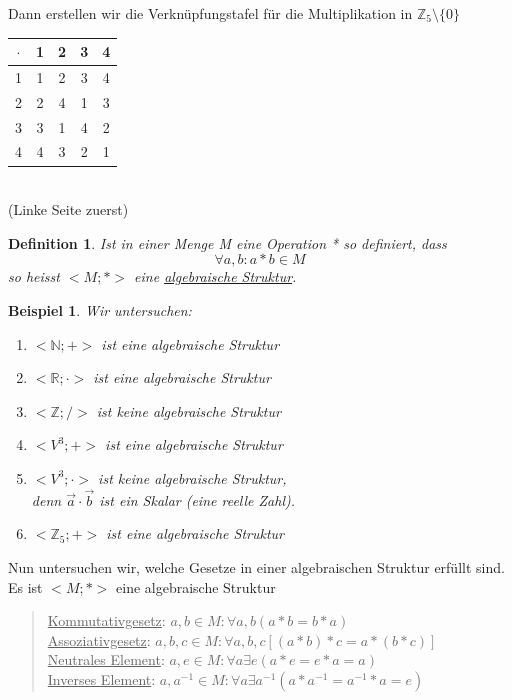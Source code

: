 \documentclass{report}
\newtheorem{mydef}{Definition}
\newtheorem{myexample}{Beispiel}
\begin{document}
Dann erstellen wir die Verknüpfungstafel für die Multiplikation in $\mathbb{Z}_5 \setminus \{0\}$
\begin{center}\begin{tabular}{c | c c c c}
$\cdot$ & 1 & 2 & 3 & 4 \\
\hline
1 & 1 & 2 & 3 & 4 \\
2 & 2 & 4 & 1 & 3 \\
3 & 3 & 1 & 4 & 2 \\
4 & 4 & 3 & 2 &1\end{tabular}\\(Linke Seite zuerst)\end{center}
\begin{mydef}Ist in einer Menge M eine Operation * so definiert, dass
\begin{equation}\forall a, b : a * b \in M\end{equation}
so heisst $< M; * >$ eine \underline{algebraische Struktur}.\end{mydef}
\begin{myexample}Wir untersuchen:
\begin{enumerate}\item $<\mathbb{N} ; + >$ ist eine algebraische Struktur
\item $<\mathbb{R} ; \cdot >$ ist eine algebraische Struktur
\item $<\mathbb{Z} ; / >$ ist keine algebraische Struktur
\item $< V^3 ; + >$ ist eine algebraische Struktur
\item $< V^3 ; \cdot >$ ist keine algebraische Struktur,\\
denn $\vec{a} \cdot \vec{b}$ ist ein Skalar (eine reelle Zahl).
\item $< \mathbb{Z}_5 ; + >$ ist eine algebraische Struktur\end{enumerate}\end{myexample}
Nun untersuchen wir, welche Gesetze in einer algebraischen Struktur erfüllt sind.
Es ist $< M ; * >$ eine algebraische Struktur
\begin{quote}\underline{Kommutativgesetz}: $a,b \in M : \forall a,b (a * b = b * a)$\\
\underline{Assoziativgesetz}: $a, b, c \in M : \forall a,b,c [(a * b) * c = a *(b * c)]$\\
\underline{Neutrales Element}: $a,e \in M : \forall a \exists e (a * e = e * a = a)$\\
\underline{Inverses Element}: $a, a^{-1} \in M : \forall a \exists a^{-1} ( a * a^{-1} = a^{-1} * a = e)$\end{quote}
\end{document}
